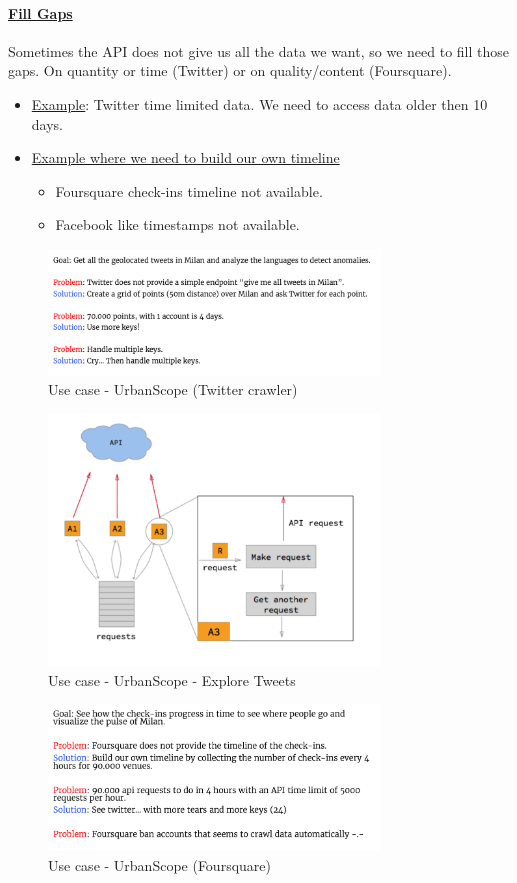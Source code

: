 \documentclass[10pt,a4paper]{article}
\begin{document}
 \paragraph{\uline{Fill Gaps}}
 Sometimes the API does not give us all the data we want, so we need to fill those gaps. On quantity or time (Twitter) or on quality/content (Foursquare).
 \begin{itemize}
 	\item \uline{Example}: Twitter time limited data. We need to access data older then 10 days.
	\item \uline{Example where we need to build our own timeline}
\begin{itemize}
	\item Foursquare check-ins timeline not available. 
	\item Facebook like timestamps not available.
\end{itemize} 
 \end{itemize}
\begin{figure}[ht!]
 \hfill \includegraphics[width=250pt]{images/use-case-urbanscope}
 \hspace*{\fill}
 \caption{Use case - UrbanScope (Twitter crawler)}
 \end{figure}
 \begin{figure}[ht!]
 \hfill \includegraphics[width=250pt]{images/use-case-urbanscope-ex}
 \hspace*{\fill}
 \caption{Use case - UrbanScope - Explore Tweets}
 \end{figure}
 \pagebreak
  \begin{figure}[ht!]
 \hfill \includegraphics[width=250pt]{images/use-case-urbanscope-foursquare}
 \hspace*{\fill}
 \caption{Use case - UrbanScope (Foursquare)}
 \end{figure}
\end{document}
